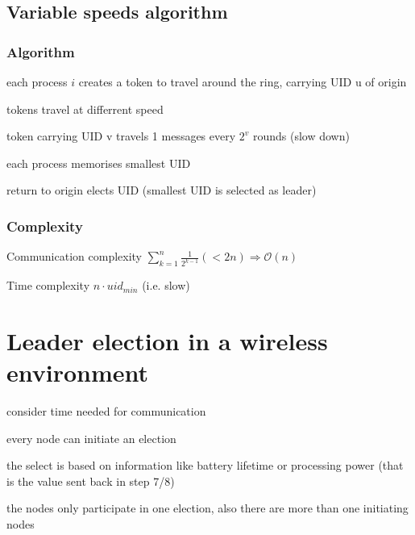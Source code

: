 \subsection{Variable speeds algorithm}

\subsubsection*{Algorithm}
\begin{compactitem}
\item each process $i$ creates a token to travel around the ring, carrying UID u of origin
\item tokens travel at differrent speed
\item token carrying UID v travels  1 messages every $2^{v}$ rounds (slow down)
\item each process memorises smallest UID
\item return to origin elects UID (smallest UID is selected as leader)
\end{compactitem}

\subsubsection*{Complexity}

\begin{compactdesc}
	\item[Communication complexity] $\sum\limits_{k=1}^n \frac{1}{2^{k-1}} (<2n) \Rightarrow \mathcal{O}(n)$
	\item[Time complexity] $n\cdot uid_{min}$ (i.e. slow)
\end{compactdesc}

\section{Leader election in a wireless environment}
\begin{compactitem}
\item consider time needed for communication
\item every node can initiate an election
\item the select is based on information like battery lifetime or processing power (that is the value sent back in step 7/8)
\item the nodes only participate in one election, also there are more than one initiating nodes
\end{compactitem}

